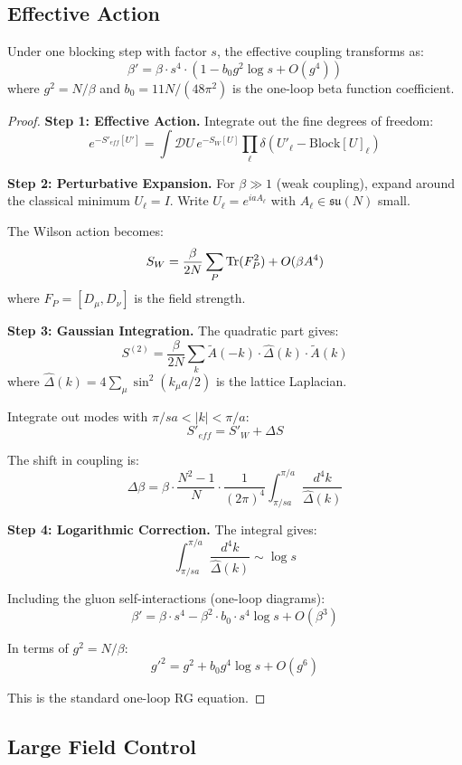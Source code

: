 \subsection{Effective Action}

\begin{theorem}
\label{thm:rg-flow}
Under one blocking step with factor $s$, the effective coupling transforms as:
\[
\beta' = \beta \cdot s^4 \cdot (1 - b_0 g^2 \log s + O(g^4))
\]
where $g^2 = N/\beta$ and $b_0 = 11N/(48\pi^2)$ is the one-loop beta function 
coefficient.
\end{theorem}

\begin{proof}
\textbf{Step 1: Effective Action.}
Integrate out the fine degrees of freedom:
\[
e^{-S'_{eff}[U']} = \int \mathcal{D}U \, e^{-S_W[U]} \prod_\ell \delta(U'_\ell - \text{Block}[U]_\ell)
\]

\textbf{Step 2: Perturbative Expansion.}
For $\beta \gg 1$ (weak coupling), expand around the classical minimum 
$U_\ell = I$. Write $U_\ell = e^{ia A_\ell}$ with $A_\ell \in \mathfrak{su}(N)$ small.

The Wilson action becomes:
\[
S_W = \frac{\beta}{2N} \sum_P \operatorname{Tr}(F_P^2) + O(\beta A^4)
\]
where $F_P = [D_\mu, D_\nu]$ is the field strength.

\textbf{Step 3: Gaussian Integration.}
The quadratic part gives:
\[
S^{(2)} = \frac{\beta}{2N} \sum_k \tilde{A}(-k) \cdot \hat{\Delta}(k) \cdot \tilde{A}(k)
\]
where $\hat{\Delta}(k) = 4\sum_\mu \sin^2(k_\mu a/2)$ is the lattice Laplacian.

Integrate out modes with $\pi/sa < |k| < \pi/a$:
\[
S'_{eff} = S'_W + \Delta S
\]

The shift in coupling is:
\[
\Delta \beta = \beta \cdot \frac{N^2-1}{N} \cdot \frac{1}{(2\pi)^4} \int_{\pi/sa}^{\pi/a} \frac{d^4k}{\hat{\Delta}(k)}
\]

\textbf{Step 4: Logarithmic Correction.}
The integral gives:
\[
\int_{\pi/sa}^{\pi/a} \frac{d^4k}{\hat{\Delta}(k)} \sim \log s
\]

Including the gluon self-interactions (one-loop diagrams):
\[
\beta' = \beta \cdot s^4 - \beta^2 \cdot b_0 \cdot s^4 \log s + O(\beta^3)
\]

In terms of $g^2 = N/\beta$:
\[
g'^2 = g^2 + b_0 g^4 \log s + O(g^6)
\]

This is the standard one-loop RG equation.
\end{proof}

\subsection{Large Field Control}

